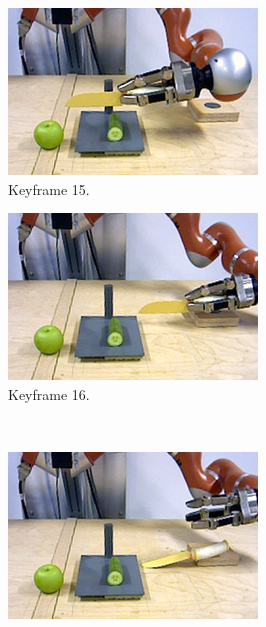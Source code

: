 \begin{figure}
\begin{subfigure}[t]{0.475\textwidth}
    \includegraphics[width=\textwidth]{./figures/sec/planning/exec4/frame5803.jpg}
    \caption{Keyframe 15.}
    \label{fig:sec_usingaffordanceforplanning_results_scenario4_15}
  \end{subfigure}
  \hfill
  \begin{subfigure}[t]{0.475\textwidth}
    \includegraphics[width=\textwidth]{./figures/sec/planning/exec4/frame6101.jpg}
    \caption{Keyframe 16.}
    \label{fig:sec_usingaffordanceforplanning_results_scenario4_16}
  \end{subfigure}\\%
  \begin{subfigure}[t]{0.475\textwidth}
    \includegraphics[width=\textwidth]{./figures/sec/planning/exec4/frame6211.jpg}

\end{subfigure}
\end{figure}

